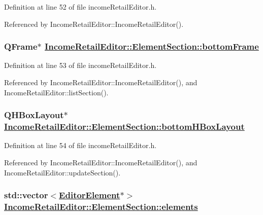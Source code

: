 Definition at line 52 of file income\-Retail\-Editor.h.

Referenced by Income\-Retail\-Editor::Income\-Retail\-Editor().\hypertarget{structIncomeRetailEditor_1_1ElementSection_o4}{
\subsubsection[bottomFrame]{\setlength{\rightskip}{0pt plus 5cm}QFrame$\ast$ \hyperlink{structIncomeRetailEditor_1_1ElementSection_o4}{Income\-Retail\-Editor::Element\-Section::bottom\-Frame}}}
\label{structIncomeRetailEditor_1_1ElementSection_o4}


Definition at line 53 of file income\-Retail\-Editor.h.

Referenced by Income\-Retail\-Editor::Income\-Retail\-Editor(), and Income\-Retail\-Editor::list\-Section().\hypertarget{structIncomeRetailEditor_1_1ElementSection_o5}{
\subsubsection[bottomHBoxLayout]{\setlength{\rightskip}{0pt plus 5cm}QHBox\-Layout$\ast$ \hyperlink{structIncomeRetailEditor_1_1ElementSection_o5}{Income\-Retail\-Editor::Element\-Section::bottom\-HBox\-Layout}}}
\label{structIncomeRetailEditor_1_1ElementSection_o5}


Definition at line 54 of file income\-Retail\-Editor.h.

Referenced by Income\-Retail\-Editor::Income\-Retail\-Editor(), and Income\-Retail\-Editor::update\-Section().\hypertarget{structIncomeRetailEditor_1_1ElementSection_o8}{
\subsubsection[elements]{\setlength{\rightskip}{0pt plus 5cm}std::vector$<$\hyperlink{classEditorElement}{Editor\-Element}$\ast$$>$ \hyperlink{structIncomeRetailEditor_1_1ElementSection_o8}{Income\-Retail\-Editor::Element\-Section::elements}}}
\label{structIncomeRetailEditor_1_1ElementSection_o8}


